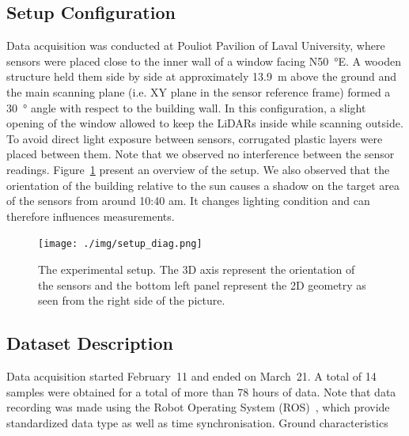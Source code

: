 \subsection{Setup Configuration} %
Data acquisition was conducted at Pouliot Pavilion of Laval University, where sensors were placed close to the inner wall of a window facing N\SI{50}{\degree}E. A wooden structure held them side by side at approximately \SI{13.9}{\meter} above the ground and the main scanning plane (i.e. XY plane in the sensor reference frame) formed a \SI{30}{\degree} angle with respect to the building wall. In this configuration, a slight opening of the window allowed to keep the LiDARs inside while scanning outside. To avoid direct light exposure between sensors, corrugated plastic layers were placed between them. Note that we observed no interference between the sensor readings. Figure~\ref{fig:setup} present an overview of the setup. We also observed that the orientation of the building relative to the sun causes a shadow on the target area of the sensors from around 10:40 am. It changes lighting condition and can therefore influences measurements. 

\begin{figure}[h]
    \centering
    \texttt{[image: ./img/setup\_diag.png]}
    \caption{The experimental setup. The 3D axis represent the orientation of the sensors and the bottom left panel represent the 2D geometry as seen from the right side of the picture.}
    \label{fig:setup}
\end{figure}


\subsection{Dataset Description} %
Data acquisition started February~11 and ended on March~21. A total of 14 samples were obtained for a total of more than 78 hours of data.
Note that data recording was made using the Robot Operating System (ROS)~\cite{ROSWeb}, which provide standardized data type as well as time synchronisation.
Ground characteristics

